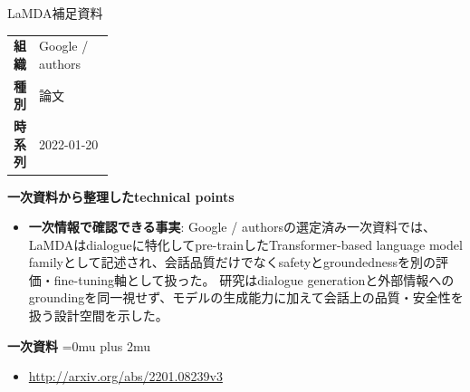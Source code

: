 \begin{technicalnote}{LaMDA}{補足資料}
\begingroup
\begin{tabularx}{\linewidth}{@{}>{\bfseries}p{0.22\linewidth}X@{}}
組織 & Google / authors \\
種別 & 論文 \\
時系列 & 2022-01-20 \\
\end{tabularx}
\smallskip
{\bfseries 一次資料から整理したtechnical points}
\begin{itemize}[leftmargin=1.5em,itemsep=0.35em]
\item \textbf{一次情報で確認できる事実}: Google / authorsの選定済み一次資料では、LaMDAはdialogueに特化してpre-trainしたTransformer-based language model familyとして記述され、会話品質だけでなくsafetyとgroundednessを別の評価・fine-tuning軸として扱った。 研究はdialogue generationと外部情報へのgroundingを同一視せず、モデルの生成能力に加えて会話上の品質・安全性を扱う設計空間を示した。
\end{itemize}
\begin{minipage}{\linewidth}
\begin{samepage}
{\bfseries 一次資料}
\begingroup\sloppy
\Urlmuskip=0mu plus 2mu\relax
\begin{itemize}[leftmargin=1.5em,itemsep=0.25em]
\item {\scriptsize\url{http://arxiv.org/abs/2201.08239v3}}
\end{itemize}
\endgroup
\end{samepage}
\end{minipage}
\endgroup
\end{technicalnote}
\medskip

